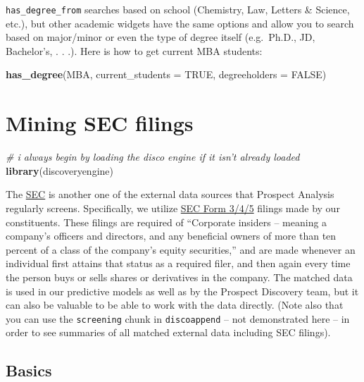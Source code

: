 \documentclass[]{book}
\newenvironment{Shaded}{\begin{snugshade}}{\end{snugshade}}
\newcommand{\CommentTok}[1]{\textcolor[rgb]{0.56,0.35,0.01}{\textit{#1}}}
\newcommand{\DataTypeTok}[1]{\textcolor[rgb]{0.13,0.29,0.53}{#1}}
\newcommand{\KeywordTok}[1]{\textcolor[rgb]{0.13,0.29,0.53}{\textbf{#1}}}
\newcommand{\NormalTok}[1]{#1}
\newcommand{\OtherTok}[1]{\textcolor[rgb]{0.56,0.35,0.01}{#1}}
\begin{document}
\texttt{has\_degree\_from} searches based on school (Chemistry, Law, Letters \& Science, etc.), but other academic widgets have the same options and allow you to search based on major/minor or even the type of degree itself (e.g.~Ph.D., JD, Bachelor's, . . .). Here is how to get current MBA students:

\begin{Shaded}
\begin{Highlighting}[]
\KeywordTok{has_degree}\NormalTok{(MBA, }\DataTypeTok{current_students =} \OtherTok{TRUE}\NormalTok{, }\DataTypeTok{degreeholders =} \OtherTok{FALSE}\NormalTok{)}
\end{Highlighting}
\end{Shaded}

\hypertarget{ex-sec}{%
\chapter{Mining SEC filings}\label{ex-sec}}

\begin{Shaded}
\begin{Highlighting}[]
\CommentTok{# i always begin by loading the disco engine if it isn't already loaded}
\KeywordTok{library}\NormalTok{(discoveryengine)}
\end{Highlighting}
\end{Shaded}

The \href{https://www.sec.gov/}{SEC} is another one of the external data sources that Prospect Analysis regularly screens. Specifically, we utilize \href{https://www.sec.gov/fast-answers/answersform345htm.html}{SEC Form 3/4/5} filings made by our constituents. These filings are required of ``Corporate insiders -- meaning a company's officers and directors, and any beneficial owners of more than ten percent of a class of the company's equity securities,'' and are made whenever an individual first attains that status as a required filer, and then again every time the person buys or sells shares or derivatives in the company. The matched data is used in our predictive models as well as by the Prospect Discovery team, but it can also be valuable to be able to work with the data directly. (Note also that you can use the \texttt{screening} chunk in \texttt{discoappend} -- not demonstrated here -- in order to see summaries of all matched external data including SEC filings).

\hypertarget{basics-1}{%
\section{Basics}\label{basics-1}}
\end{document}
